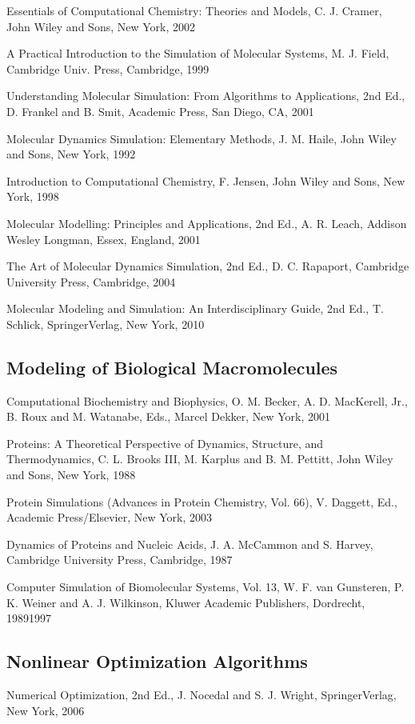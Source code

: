 \documentclass[letterpaper,11pt,english]{sphinxmanual}
\begin{document}
Essentials of Computational Chemistry: Theories and Models, C. J. Cramer, John Wiley and Sons, New York, 2002

A Practical Introduction to the Simulation of Molecular Systems, M. J. Field, Cambridge Univ. Press, Cambridge, 1999

Understanding Molecular Simulation: From Algorithms to Applications, 2nd Ed., D. Frankel and B. Smit, Academic Press, San Diego, CA, 2001

Molecular Dynamics Simulation: Elementary Methods, J. M. Haile, John Wiley and Sons, New York, 1992

Introduction to Computational Chemistry, F. Jensen, John Wiley and Sons, New York, 1998

Molecular Modelling: Principles and Applications, 2nd Ed., A. R. Leach, Addison Wesley Longman, Essex, England, 2001

The Art of Molecular Dynamics Simulation, 2nd Ed., D. C. Rapaport, Cambridge University Press, Cambridge, 2004

Molecular Modeling and Simulation: An Interdisciplinary Guide, 2nd Ed., T. Schlick, Springer\sphinxhyphen{}Verlag, New York, 2010


\subsection{Modeling of Biological Macromolecules}
\label{\detokenize{text/references:modeling-of-biological-macromolecules}}
Computational Biochemistry and Biophysics, O. M. Becker, A. D. MacKerell, Jr., B. Roux and M. Watanabe, Eds., Marcel Dekker, New York, 2001

Proteins: A Theoretical Perspective of Dynamics, Structure, and Thermodynamics, C. L. Brooks III, M. Karplus and B. M. Pettitt, John Wiley and Sons, New York, 1988

Protein Simulations (Advances in Protein Chemistry, Vol. 66), V. Daggett, Ed., Academic Press/Elsevier, New York, 2003

Dynamics of Proteins and Nucleic Acids, J. A. McCammon and S. Harvey, Cambridge University Press, Cambridge, 1987

Computer Simulation of Biomolecular Systems, Vol. 1\sphinxhyphen{}3, W. F. van Gunsteren, P. K. Weiner and A. J. Wilkinson, Kluwer Academic Publishers, Dordrecht, 1989\sphinxhyphen{}1997


\subsection{Nonlinear Optimization Algorithms}
\label{\detokenize{text/references:nonlinear-optimization-algorithms}}
Numerical Optimization, 2nd Ed., J. Nocedal and S. J. Wright, Springer\sphinxhyphen{}Verlag, New York, 2006
\end{document}
